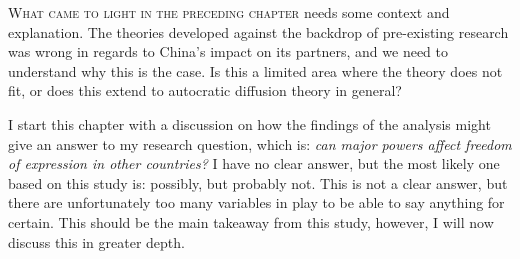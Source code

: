 \lettrine{W}{hat came to light in the preceding chapter} needs some context and explanation. The theories developed against the backdrop of pre-existing research was wrong in regards to China's impact on its partners, and we need to understand why this is the case. Is this a limited area where the theory does not fit, or does this extend to autocratic diffusion theory in general?

I start this chapter with a discussion on how the findings of the analysis might give an answer to my research question, which is: \textit{can major powers affect freedom of expression in other countries?} I have no clear answer, but the most likely one based on this study is: possibly, but probably not. This is not a clear answer, but there are unfortunately too many variables in play to be able to say anything for certain. This should be the main takeaway from this study, however, I will now discuss this in greater depth.

\